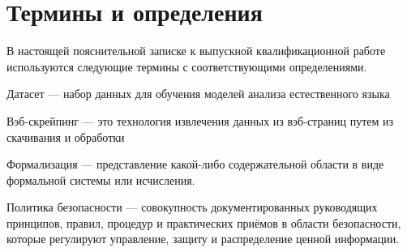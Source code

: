\documentclass[../main]{subfiles}
\begin{document}
\newpage
{}
\section*{Термины и определения}

В настоящей пояснительной записке к выпускной квалификационной
работе используются следующие термины с соответствующими
определениями.

\begin{termenum}
    \item Датасет --- набор данных для обучения моделей анализа естественного языка
    \item Вэб-скрейпинг --- это технология извлечения данных из вэб-страниц путем из скачивания и обработки
    \item Формализация --- представление какой-либо содержательной области в виде формальной системы или исчисления. 
    \item Политика безопасности --- совокупность документированных руководящих принципов, правил, процедур и практических приёмов в области безопасности, которые регулируют управление, защиту и распределение ценной информации. 
\end{termenum}
\end{document}
